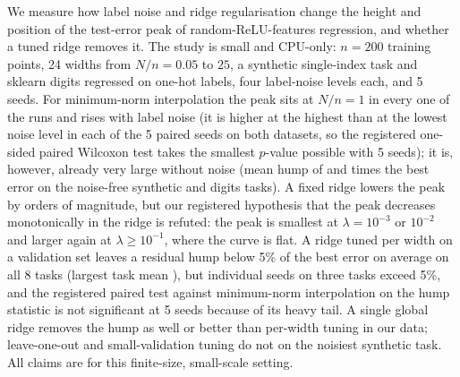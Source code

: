 We measure how label noise and ridge regularisation change the height and position of the test-error peak of random-ReLU-features regression, and whether a tuned ridge removes it. The study is small and CPU-only: $n=200$ training points, 24 widths from $N/n=0.05$ to $25$, a synthetic single-index task and sklearn digits regressed on one-hot labels, four label-noise levels each, and 5 seeds. For minimum-norm interpolation the peak sits at $N/n=1$ in every one of the  runs and rises with label noise (it is higher at the highest than at the lowest noise level in each of the 5 paired seeds on both datasets, so the registered one-sided paired Wilcoxon test takes the smallest $p$-value possible with 5 seeds); it is, however, already very large without noise (mean hump of  and  times the best error on the noise-free synthetic and digits tasks). A fixed ridge lowers the peak by orders of magnitude, but our registered hypothesis that the peak decreases monotonically in the ridge is refuted: the peak is smallest at $\lambda=10^{-3}$ or $10^{-2}$ and larger again at $\lambda\ge10^{-1}$, where the curve is flat. A ridge tuned per width on a validation set leaves a residual hump below 5\% of the best error on average on all 8 tasks (largest task mean ), but individual seeds on three tasks exceed 5\%, and the registered paired test against minimum-norm interpolation on the hump statistic is not significant at 5 seeds because of its heavy tail. A single global ridge removes the hump as well or better than per-width tuning in our data; leave-one-out and small-validation tuning do not on the noisiest synthetic task. All claims are for this finite-size, small-scale setting.
